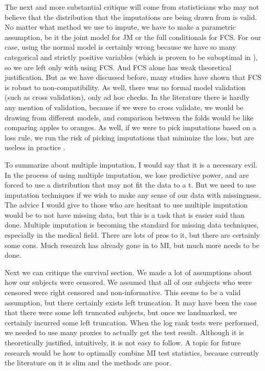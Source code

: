 The next and more substantial critique will come from statisticians who may not believe that the distribution that the imputations are being drawn from is valid. No matter what method we use to impute, we have to make a parametric assumption, be it the joint model for JM or the full conditionals for FCS.  For our case, using the normal model is certainly wrong because we have so many categorical and strictly positive variables (which is proven to be suboptimal in \cite{Kropko2014}), so we are left only with using FCS. And FCS alone has weak theoretical justification. But as we have discussed before, many studies have shown that FCS is robust to non-compatibility. As well, there was no formal model validation (such as cross validation), only ad hoc checks. In the literature there is hardly any mention of validation, because if we were to cross validate, we would be drawing from different models, and comparison between the folds would be like comparing apples to oranges. As well, if we were to pick imputations based on a loss rule, we run the risk of picking imputations that minimize the loss, but are useless in practice \cite{VanBuuren2012}.

\begin{comment}
An interesting future extension to this project would be to use a non parametric approach to multiple imputation, such as the one suggested by Long et al in \cite{Long2012}. But at the time of publication, there is not much literature or software on this subject, so I felt that it was not appropriate to use its results.  
\end{comment}
To summarize about multiple imputation, I would say that it is a necessary evil. In the process of using multiple imputation, we lose predictive power, and are forced to use a distribution that may not fit the data to a t. But we need to use imputation techniques if we wish to make any sense of our data with missingness. The advice I would give to those who are hesitant to use multiple imputation would be to not have missing data, but this is a task that is easier said than done. Multiple imputation is becoming the standard for missing data techniques, especially in the medical field. There are lots of pros to it, but there are certainly some cons. Much research has already gone in to MI, but much more needs to be done.

Next we can critique the survival section. We made a lot of assumptions about how our subjects were censored. We assumed that all of our subjects who were censored were right censored and non-informative. This seems to be a valid assumption, but there certainly exists left truncation. It may have been the case that there were some left truncated subjects, but once we landmarked, we certainly incurred some left truncation. When the log rank tests were performed, we needed to use many proxies to actually get the test result. Although it is theoretically justified, intuitively, it is not easy to follow. A topic for future research would be how to optimally combine MI test statistics, because currently the literature on it is slim and the methods are poor.

